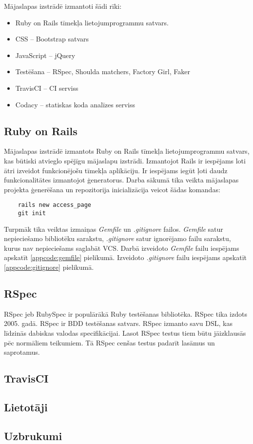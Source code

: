 Mājaslapas izstrādē izmantoti šādi rīki:
\begin{itemize}
	\item Ruby on Rails tīmekļa lietojumprogrammu satvars.
	\item CSS -- Bootstrap satvars
	\item JavaScript -- jQuery
	\item Testēšana -- RSpec, Shoulda matchers, Factory Girl, Faker
	\item TravisCI -- CI serviss
	\item Codacy -- statiskas koda analīzes serviss
\end{itemize}

\subsection{Ruby on Rails}
Mājaslapas izstrādē izmantots Ruby on Rails tīmekļa lietojumprogrammu satvars, kas būtiski atvieglo spējīgu mājaslapu izstrādi.
Izmantojot Rails ir iespējams loti ātri izveidot funkcionējošu tīmekļa aplikāciju. Ir iespējams iegūt ļoti daudz funkcionalitātes izmantojot ģeneratorus.
Darba sākumā tika veikta mājaslapas projekta ģenerēšana un repozitorija inicializācija veicot šādas komandas:
\begin{lstlisting}
	rails new access_page
	git init
\end{lstlisting}
Turpmāk tika veiktas izmaiņas \textit{Gemfile} un \textit{.gitignore} failos. \textit{Gemfile} satur nepieciešamo bibliotēku sarakstu, \textit{.gitignore} satur ignorējamo failu sarakstu, kurus nav nepieciešams saglabāt VCS.
Darbā izveidoto \textit{Gemfile} failu iespējams apskatīt \ref{appcode:gemfile} pielikumā. Izveidoto \textit{.gitignore} failu iespējams apskatīt \ref{appcode:gitignore} pielikumā.


\subsection{RSpec}
RSpec jeb RubySpec ir populārākā Ruby testēšanas bibliotēka. RSpec tika izdots 2005. gadā.
\cite{shayRspec}
RSpec ir BDD testēšanas satvars. RSpec izmanto savu DSL, kas līdzinās dabiskas valodas specifikācijai. Lasot RSpec testus tiem būtu jāizklausās pēc normāliem teikumiem. Tā RSpec cenšas testus padarīt lasāmus un saprotamus.

\subsection{TravisCI}

\subsection{Lietotāji}
\subsection{Uzbrukumi}